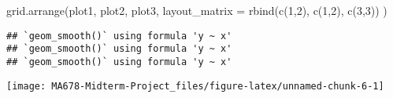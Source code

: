 \documentclass[
]{article}
\newenvironment{Shaded}{\begin{snugshade}}{\end{snugshade}}
\newcommand{\AttributeTok}[1]{\textcolor[rgb]{0.77,0.63,0.00}{#1}}
\newcommand{\DecValTok}[1]{\textcolor[rgb]{0.00,0.00,0.81}{#1}}
\newcommand{\FunctionTok}[1]{\textcolor[rgb]{0.00,0.00,0.00}{#1}}
\newcommand{\NormalTok}[1]{#1}
\begin{document}
\begin{Shaded}
\begin{Highlighting}[]
\FunctionTok{grid.arrange}\NormalTok{(plot1, plot2, plot3,}
             \AttributeTok{layout\_matrix =} \FunctionTok{rbind}\NormalTok{(}\FunctionTok{c}\NormalTok{(}\DecValTok{1}\NormalTok{,}\DecValTok{2}\NormalTok{),}
                                   \FunctionTok{c}\NormalTok{(}\DecValTok{1}\NormalTok{,}\DecValTok{2}\NormalTok{),}
                                   \FunctionTok{c}\NormalTok{(}\DecValTok{3}\NormalTok{,}\DecValTok{3}\NormalTok{))}
\NormalTok{             )}
\end{Highlighting}
\end{Shaded}

\begin{verbatim}
## `geom_smooth()` using formula 'y ~ x'
## `geom_smooth()` using formula 'y ~ x'
## `geom_smooth()` using formula 'y ~ x'
\end{verbatim}

\begin{center}\texttt{[image: MA678-Midterm-Project\_files/figure-latex/unnamed-chunk-6-1]} \end{center}
\end{document}
